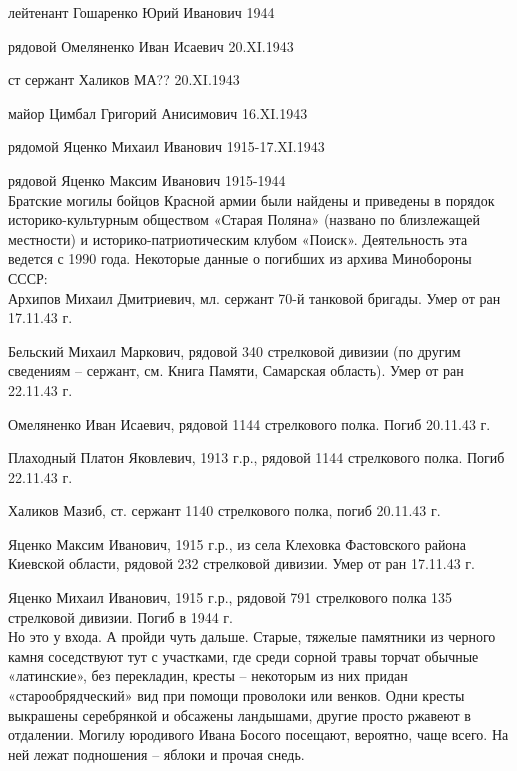 \noindent
лейтенант Гошаренко Юрий Иванович 1944

\noindent
рядовой Омеляненко Иван Исаевич 20.XI.1943

\noindent
ст сержант Халиков МА?? 20.XI.1943

\noindent
майор Цимбал Григорий Анисимович 16.XI.1943

\noindent
рядомой Яценко Михаил Иванович 1915-17.XI.1943

\noindent
рядовой Яценко Максим Иванович 1915-1944\\

Братские могилы бойцов Красной армии были найдены и приведены в порядок историко-культурным обществом «Старая Поляна» (названо по близлежащей местности) и историко-патриотическим клубом «Поиск». Деятельность эта ведется с 1990 года. Некоторые данные о погибших из архива Минобороны СССР:\\ 

\noindent
Архипов Михаил Дмитриевич, мл. сержант 70-й танковой бригады. Умер от ран 17.11.43 г. 

\noindent
Бельский Михаил Маркович, рядовой 340 стрелковой дивизии (по другим сведениям – сержант, см. Книга Памяти, Самарская область). Умер от ран 22.11.43 г. 

\noindent
Омеляненко Иван Исаевич, рядовой 1144 стрелкового полка. Погиб 20.11.43 г.

\noindent
Плаходный Платон Яковлевич, 1913 г.р., рядовой 1144 стрелкового полка. Погиб 22.11.43 г. 

\noindent
Халиков Мазиб, ст. сержант 1140 стрелкового полка, погиб 20.11.43 г.

\noindent
Яценко Максим Иванович, 1915 г.р., из села Клеховка Фастовского района Киевской области, рядовой 232 стрелковой дивизии. Умер от ран 17.11.43 г. 

\noindent
Яценко Михаил Иванович, 1915 г.р., рядовой 791 стрелкового полка 135 стрелковой дивизии. Погиб в 1944 г.\\


Но это у входа. А пройди чуть дальше. Старые, тяжелые памятники из черного камня соседствуют тут с участками, где среди сорной травы торчат обычные «латинские», без перекладин, кресты – некоторым из них придан «старообрядческий» вид при помощи проволоки или венков. Одни кресты выкрашены серебрянкой и обсажены ландышами, другие просто ржавеют в отдалении. Могилу юродивого Ивана Босого посещают, вероятно, чаще всего. На ней лежат подношения – яблоки и прочая снедь.

